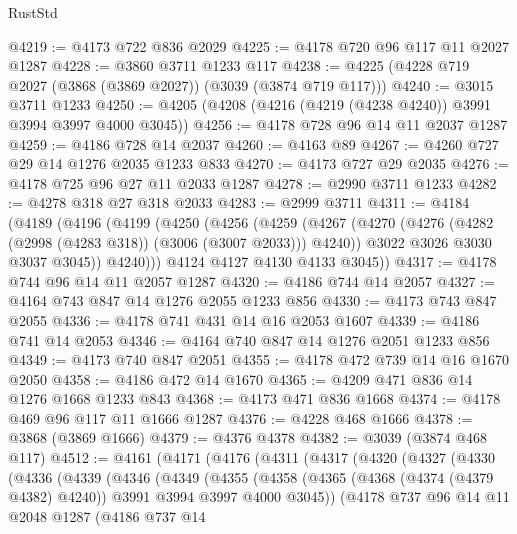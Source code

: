 \begin{lexlean}{RustStd}
\begin{coremodule}
@4219 := @4173 @722 @836 @2029
@4225 := @4178 @720 @96 @117 @11 @2027 @1287
@4228 := @3860 @3711 @1233 @117
@4238 := @4225 (@4228 @719 @2027 (@3868 (@3869 @2027)) (@3039 (@3874 @719 @117)))
@4240 := @3015 @3711 @1233
@4250 := @4205 (@4208 (@4216 (@4219 (@4238 @4240)) @3991 @3994 @3997 @4000 @3045))
@4256 := @4178 @728 @96 @14 @11 @2037 @1287
@4259 := @4186 @728 @14 @2037
@4260 := @4163 @89
@4267 := @4260 @727 @29 @14 @1276 @2035 @1233 @833
@4270 := @4173 @727 @29 @2035
@4276 := @4178 @725 @96 @27 @11 @2033 @1287
@4278 := @2990 @3711 @1233
@4282 := @4278 @318 @27 @318 @2033
@4283 := @2999 @3711
@4311 := @4184
    (@4189
      (@4196
        (@4199
          (@4250
            (@4256
              (@4259
                (@4267
                  (@4270 (@4276 (@4282 (@2998 (@4283 @318)) (@3006 (@3007 @2033))) @4240))
                  @3022
                  @3026
                  @3030
                  @3037
                  @3045))
              @4240)))
        @4124
        @4127
        @4130
        @4133
        @3045))
@4317 := @4178 @744 @96 @14 @11 @2057 @1287
@4320 := @4186 @744 @14 @2057
@4327 := @4164 @743 @847 @14 @1276 @2055 @1233 @856
@4330 := @4173 @743 @847 @2055
@4336 := @4178 @741 @431 @14 @16 @2053 @1607
@4339 := @4186 @741 @14 @2053
@4346 := @4164 @740 @847 @14 @1276 @2051 @1233 @856
@4349 := @4173 @740 @847 @2051
@4355 := @4178 @472 @739 @14 @16 @1670 @2050
@4358 := @4186 @472 @14 @1670
@4365 := @4209 @471 @836 @14 @1276 @1668 @1233 @843
@4368 := @4173 @471 @836 @1668
@4374 := @4178 @469 @96 @117 @11 @1666 @1287
@4376 := @4228 @468 @1666
@4378 := @3868 (@3869 @1666)
@4379 := @4376 @4378
@4382 := @3039 (@3874 @468 @117)
@4512 := @4161
    (@4171
      (@4176
        (@4311
          (@4317
            (@4320
              (@4327
                (@4330
                  (@4336
                    (@4339
                      (@4346
                        (@4349
                          (@4355
                            (@4358
                              (@4365
                                (@4368 (@4374 (@4379 @4382) @4240))
                                @3991
                                @3994
                                @3997
                                @4000
                                @3045))
                            (@4178
                              @737
                              @96
                              @14
                              @11
                              @2048
                              @1287
                              (@4186
                                @737
                                @14

\end{coremodule}
\end{lexlean}
